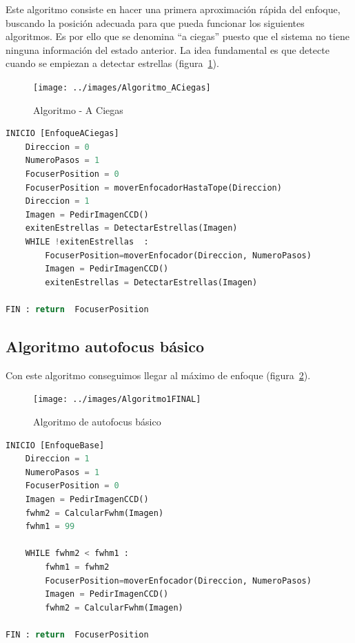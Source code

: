 Este algoritmo consiste en hacer una primera aproximación rápida del enfoque, buscando la posición adecuada para que pueda funcionar los siguientes algoritmos. Es por ello que se denomina ``a ciegas'' puesto que el sistema no tiene ninguna información del estado anterior. La idea fundamental es que detecte cuando se empiezan a detectar estrellas (figura~\ref{fig:Algoritmo1-Focuser}).

\begin{figure}
\centering
\texttt{[image: ../images/Algoritmo\_ACiegas]}
\caption[Algoritmo - A Ciegas]{Algoritmo - A Ciegas}
\label{fig:Algoritmo1-Focuser}
\end{figure}

\begin{lstlisting}[language=python]
INICIO [EnfoqueACiegas]
    Direccion = 0
    NumeroPasos = 1
    FocuserPosition = 0
    FocuserPosition = moverEnfocadorHastaTope(Direccion)
    Direccion = 1
    Imagen = PedirImagenCCD()
    exitenEstrellas = DetectarEstrellas(Imagen)
    WHILE !exitenEstrellas  :
        FocuserPosition=moverEnfocador(Direccion, NumeroPasos)
        Imagen = PedirImagenCCD()
        exitenEstrellas = DetectarEstrellas(Imagen)
        
FIN : return  FocuserPosition    
\end{lstlisting} 



\subsection{Algoritmo autofocus básico}

Con este algoritmo conseguimos llegar al máximo de enfoque (figura~\ref{fig:Algoritmo2-Focuser}).

\begin{figure}[]
	\centering
	\texttt{[image: ../images/Algoritmo1FINAL]}
	\caption[Algoritmo de autofocus básico]{Algoritmo de autofocus básico}
	\label{fig:Algoritmo2-Focuser}
\end{figure}

\begin{lstlisting}[language=python]
INICIO [EnfoqueBase]
    Direccion = 1
    NumeroPasos = 1
    FocuserPosition = 0
    Imagen = PedirImagenCCD()
    fwhm2 = CalcularFwhm(Imagen)
    fwhm1 = 99
    
    WHILE fwhm2 < fwhm1 :
        fwhm1 = fwhm2
        FocuserPosition=moverEnfocador(Direccion, NumeroPasos)
        Imagen = PedirImagenCCD()
        fwhm2 = CalcularFwhm(Imagen)
        
FIN : return  FocuserPosition   
\end{lstlisting} 


